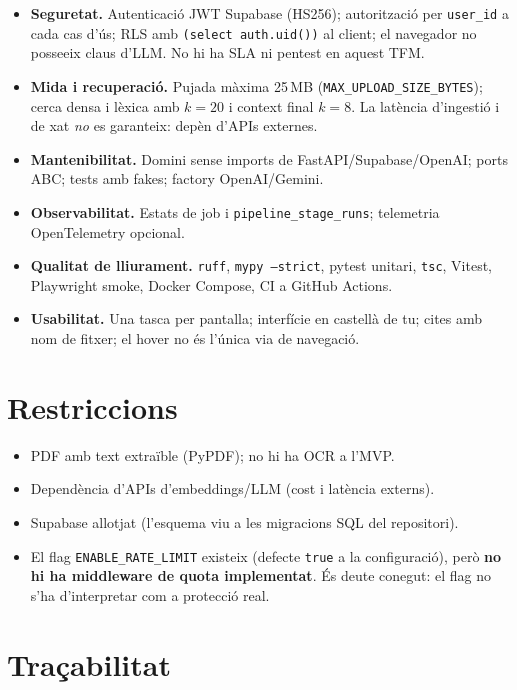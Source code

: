 \begin{itemize}
  \item \textbf{Seguretat.} Autenticació JWT Supabase (HS256); autorització per \texttt{user\_id} a cada cas d'ús; RLS amb \texttt{(select auth.uid())} al client; el navegador no posseeix claus d'LLM. No hi ha SLA ni pentest en aquest TFM.
  \item \textbf{Mida i recuperació.} Pujada màxima 25\,MB (\texttt{MAX\_UPLOAD\_SIZE\_BYTES}); cerca densa i lèxica amb $k=20$ i context final $k=8$. La latència d'ingestió i de xat \emph{no} es garanteix: depèn d'APIs externes.
  \item \textbf{Mantenibilitat.} Domini sense imports de FastAPI/Supabase/OpenAI; ports ABC; tests amb fakes; factory OpenAI/Gemini.
  \item \textbf{Observabilitat.} Estats de job i \texttt{pipeline\_stage\_runs}; telemetria OpenTelemetry opcional.
  \item \textbf{Qualitat de lliurament.} \texttt{ruff}, \texttt{mypy --strict}, pytest unitari, \texttt{tsc}, Vitest, Playwright smoke, Docker Compose, CI a GitHub Actions.
  \item \textbf{Usabilitat.} Una tasca per pantalla; interfície en castellà de tu; cites amb nom de fitxer; el hover no és l'única via de navegació.
\end{itemize}

\section{Restriccions}

\begin{itemize}
  \item PDF amb text extraïble (PyPDF); no hi ha OCR a l'MVP.
  \item Dependència d'APIs d'embeddings/LLM (cost i latència externs).
  \item Supabase allotjat (l'esquema viu a les migracions SQL del repositori).
  \item El flag \texttt{ENABLE\_RATE\_LIMIT} existeix (defecte \texttt{true} a la configuració), però \textbf{no hi ha middleware de quota implementat}. És deute conegut: el flag no s'ha d'interpretar com a protecció real.
\end{itemize}

\section{Traçabilitat}

